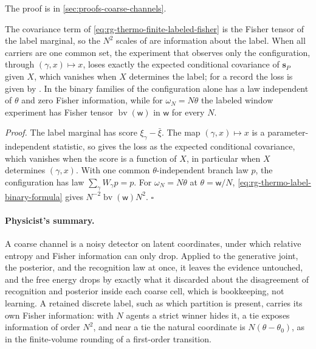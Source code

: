 The proof is in \cref{sec:proofs-coarse-channels}.

The covariance term of \eqref{eq:rg-thermo-finite-labeled-fisher} is the Fisher tensor of the label
marginal, so the $N^2$ scales of 
are information about the label. When all carriers are one common set, the experiment that observes
only the configuration, through $(\gamma,x)\mapsto x$, loses exactly the expected conditional
covariance of $\mathbf s_P$ given $X$, which vanishes when $X$ determines the label; for a record
the loss is given by . In the binary families of
 the configuration alone has a law independent of
$\theta$ and zero Fisher information, while for $\omega_N=N\theta$ the labeled window experiment has
Fisher tensor $\operatorname{bv}(\mathsf w)$ in $\mathsf w$ for every $N$. 

\noindent\emph{Proof.}
The label marginal has score $\xi_\gamma-\bar\xi$. The map $(\gamma,x)\mapsto x$ is a
parameter-independent statistic, so  gives the loss as the expected
conditional covariance, which vanishes when the score is a function of $X$, in particular when $X$
determines $(\gamma,x)$. With one common $\theta$-independent branch law $p$, the configuration has
law $\sum_\gamma W_\gamma p=p$. For $\omega_N=N\theta$ at $\theta=\mathsf w/N$,
\eqref{eq:rg-thermo-label-binary-formula} gives $N^{-2}\operatorname{bv}(\mathsf w)N^2$. $\square$

\paragraph{Physicist's summary.}
A coarse channel is a noisy detector on latent coordinates, under which relative entropy and Fisher
information can only drop. Applied to the generative joint, the posterior, and the recognition law at
once, it leaves the evidence untouched, and the free energy drops by exactly what it discarded about
the disagreement of recognition and posterior inside each coarse cell, which is bookkeeping, not
learning. A retained discrete label, such as which partition is present, carries its own Fisher
information: with $N$ agents a strict winner hides it, a tie exposes information of order $N^2$, and
near a tie the natural coordinate is $N(\theta-\theta_0)$, as in the finite-volume rounding of a
first-order transition.
